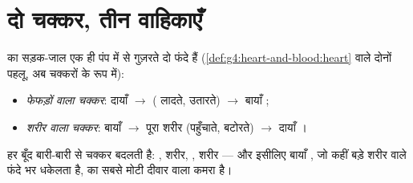 \section{दो चक्कर, तीन वाहिकाएँ}

\begin{definition}[दोहरा रक्त-चक्र]\label{def:g7:heart-and-circulation:double}
 का सड़क-जाल एक ही पंप में से गुज़रते दो फंदे हैं
(\cref{def:g4:heart-and-blood:heart} वाले दोनों पहलू, अब चक्करों के
रूप में):
\begin{itemize}
  \item \emph{फेफड़ों वाला चक्कर}: दायाँ 
        $\rightarrow$  ( लादते,  उतारते) $\rightarrow$ बायाँ ;
  \item \emph{शरीर वाला चक्कर}: बायाँ 
        $\rightarrow$ पूरा शरीर (पहुँचाते,
        बटोरते) $\rightarrow$ दायाँ ।
\end{itemize}
हर बूँद बारी-बारी से चक्कर बदलती है: , शरीर, , शरीर ---
और इसीलिए बायाँ , जो कहीं बड़े शरीर वाले फंदे भर धकेलता है,  का
सबसे मोटी दीवार वाला कमरा है।
\end{definition}

